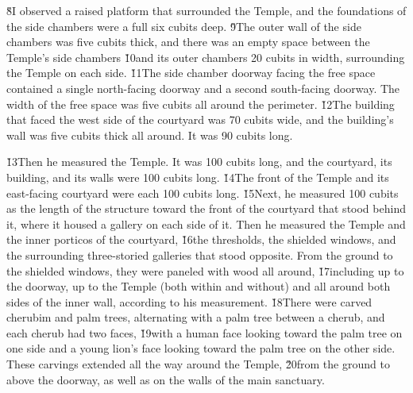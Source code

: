 \v{8}I observed a raised platform that surrounded the Temple, and the foundations of the side chambers were a full six cubits deep. \v{9}The outer wall of the side chambers was five cubits thick, and there was an empty space between the Temple's side chambers \v{10}and its outer chambers 20 cubits in width, surrounding the Temple on each side. \v{11}The side chamber doorway facing the free space contained a single north-facing doorway and a second south-facing doorway. The width of the free space was five cubits all around the perimeter. \v{12}The building that faced the west side of the courtyard was 70 cubits wide, and the building's wall was five cubits thick all around. It was 90 cubits long.

\v{13}Then he measured the Temple. It was 100 cubits long, and the courtyard, its building, and its walls were 100 cubits long. \v{14}The front of the Temple and its east-facing courtyard were each 100 cubits long. \v{15}Next, he measured 100 cubits as the length of the structure toward the front of the courtyard that stood behind it, where it housed a gallery on each side of it. Then he measured the Temple and the inner porticos of the courtyard, \v{16}the thresholds, the shielded windows, and the surrounding three-storied galleries that stood opposite. From the ground to the shielded windows, they were paneled with wood all around, \v{17}including up to the doorway, up to the Temple (both within and without) and all around both sides of the inner wall, according to his measurement. \v{18}There were carved cherubim and palm trees, alternating with a palm tree between a cherub, and each cherub had two faces, \v{19}with a human face looking toward the palm tree on one side and a young lion's face looking toward the palm tree on the other side. These carvings extended all the way around the Temple, \v{20}from the ground to above the doorway, as well as on the walls of the main sanctuary.


